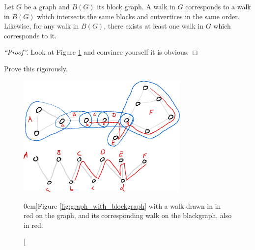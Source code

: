 \documentclass[nobib]{tufte-handout}
\begin{document}
\begin{lemma}\label{lemma:pathcorrespondence}
  Let $G$ be a graph and $B(G)$ its block graph. A walk in $G$ corresponds to a walk in $B(G)$ which intersects the same blocks and cutvertices in the same order. Likewise, for any walk in $B(G)$, there exists at least one walk in $G$ which corresponds to it.

  \begin{proof}[``Proof'']
    Look at Figure \ref{fig:pathcorrespondence} and convince yourself it is obvious.
  \end{proof}

  \begin{xca}
    Prove this rigorously.
  \end{xca}

  \begin{figure}
    \centering
    \includegraphics[width=0.75\textwidth]{graphics/L10_connectivity/pathcorrespondence.png}
    \caption[][0cm]{Figure \ref{fig:graph_with_blockgraph} with a walk drawn in in red on the graph, and its corresponding walk on the blackgraph, also in red.}
    \label{fig:pathcorrespondence}
  \end{figure}
  

\end{lemma}
\end{document}
